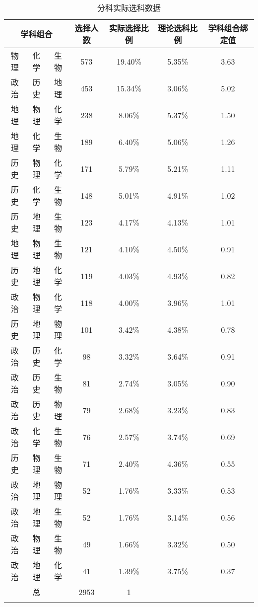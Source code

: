 \documentclass[bwprint]{cumcmthesis}
\begin{document}

	\begin{longtable}{ccccccc}
		\caption{\label{tab:per_select}分科实际选科数据}\\
		\toprule
		\multicolumn{3}{c}{学科组合} & 选择人数  & 实际选择比例 & 理论选科比例 & 学科组合绑定值 \\
		\midrule
		物理    & 化学    & 生物    & 573   & 19.40\% & 5.35\% & 3.63  \\
		政治    & 历史    & 地理    & 453   & 15.34\% & 3.06\% & 5.02  \\
		地理    & 物理    & 化学    & 238   & 8.06\% & 5.37\% & 1.50  \\
		地理    & 化学    & 生物    & 189   & 6.40\% & 5.06\% & 1.26  \\
		历史    & 物理    & 化学    & 171   & 5.79\% & 5.21\% & 1.11  \\
		历史    & 化学    & 生物    & 148   & 5.01\% & 4.91\% & 1.02  \\
		历史    & 地理    & 生物    & 123   & 4.17\% & 4.13\% & 1.01  \\
		地理    & 物理    & 生物    & 121   & 4.10\% & 4.50\% & 0.91  \\
		历史    & 地理    & 化学    & 119   & 4.03\% & 4.93\% & 0.82  \\
		政治    & 物理    & 化学    & 118   & 4.00\% & 3.96\% & 1.01  \\
		历史    & 地理    & 物理    & 101   & 3.42\% & 4.38\% & 0.78  \\
		政治    & 历史    & 化学    & 98    & 3.32\% & 3.64\% & 0.91  \\
		政治    & 历史    & 生物    & 81    & 2.74\% & 3.05\% & 0.90  \\
		政治    & 历史    & 物理    & 79    & 2.68\% & 3.23\% & 0.83  \\
		政治    & 化学    & 生物    & 76    & 2.57\% & 3.74\% & 0.69  \\
		历史    & 物理    & 生物    & 71    & 2.40\% & 4.36\% & 0.55  \\
		政治    & 地理    & 物理    & 52    & 1.76\% & 3.33\% & 0.53  \\
		政治    & 地理    & 生物    & 52    & 1.76\% & 3.14\% & 0.56  \\
		政治    & 物理    & 生物    & 49    & 1.66\% & 3.32\% & 0.50  \\
		政治    & 地理    & 化学    & 41    & 1.39\% & 3.75\% & 0.37  \\
		\midrule
		\multicolumn{3}{c}{总} & 2953  & 1     &       &  \\
		\bottomrule
		\label{tab:20select}
	\end{longtable}%
\end{document}
